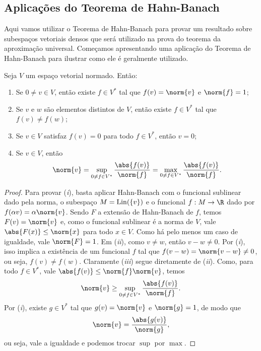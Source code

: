 \subsection{Aplicações do Teorema de Hahn-Banach}

Aqui vamos utilizar o Teorema de Hahn-Banach para provar um resultado sobre subespaços vetoriais densos que será utilizado na prova do teorema da aproximação universal.
Começamos apresentando uma aplicação do Teorema de Hahn-Banach para ilustrar como ele é geralmente utilizado.

\begin{teo}
    Seja \( V \) um espaço vetorial normado.
    Então:
    \begin{enumerate}[label=(\roman*)]
        \item Se \( 0 \neq v \in V \), então existe \( f \in V^{ * } \) tal que \( f(v) = \norm{ v } \) e \( \norm{ f } = 1 \);
        \item Se \( v \) e \( w \) são elementos distintos de \( V \), então existe \( f \in V^{ * } \) tal que \( f(v) \neq f(w) \);
        \item Se \( v \in V \) satisfaz \( f(v) = 0 \) para todo \( f \in V^{ * } \), então \( v = 0 \);
        \item Se \( v \in V \), então \[
            \norm{ v }
            = \sup_{ 0 \neq f \in V^{ * } } \frac{ \abs{ f(v) } }{ \norm{ f } }
            = \max_{ 0 \neq f \in V^{ * } } \frac{ \abs{ f(v) } }{ \norm{ f } }
        .\]
    \end{enumerate}
\end{teo}
\begin{proof}
    Para provar (\emph{i}), basta aplicar Hahn-Banach com o funcional sublinear dado pela norma, o subespaço \( M = \operatorname{Lin} (\left\{ v \right\}) \) e o funcional \( f : M \to \R \) dado por \( f(\alpha v) = \alpha \norm{ v } \).
    Sendo \( F \) a extensão de Hahn-Banach de \( f \), temos \( F(v) = \norm{ v } \) e, como o funcional sublinear é a norma de \( V \), vale \( \abs{ F(x) } \leq \norm{ x } \) para todo \( x \in V \).
    Como há pelo menos um caso de igualdade, vale \( \norm{ F } = 1 \).
    Em (\emph{ii}), como \( v \neq w \), então \( v - w \neq 0 \).
    Por (\emph{i}), isso implica a existência de um funcional \( f \) tal que \( f(v - w) = \norm{ v - w } \neq 0 \), ou seja, \( f(v) \neq f(w) \).
    Claramente (\emph{iii}) segue diretamente de (\emph{ii}).
    Como, para todo \( f \in V^{ * } \), vale \( \abs{ f(v) } \leq \norm{ f } \norm{ v } \), temos \[
        \norm{ v } \geq \sup_{ 0 \neq f \in V^{ * } } \frac{ \abs{ f(v) } }{ \norm{ f } }
    .\]
    Por (\emph{i}), existe \( g \in V^{ * } \) tal que \( g(v) = \norm{ v } \) e \( \norm{ g } = 1 \), de modo que \[
        \norm{ v } = \frac{ \abs{ g(v) } }{ \norm{ g } }
    ,\]
    ou seja, vale a igualdade e podemos trocar \( \sup \) por \( \max \).
\end{proof}


